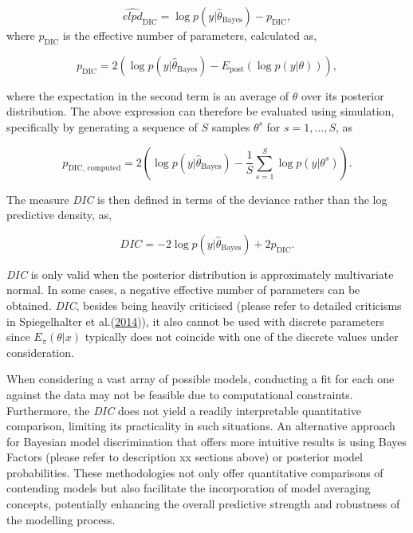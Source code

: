 \documentclass[
  11pt,
]{article}
\begin{document}
\begin{equation}
\widehat{elpd}_{\text{DIC}} = \log p(y|\hat{\theta}_{\text{Bayes}}) - p_{\text{DIC}},
\end{equation} where \(p_{\text{DIC}}\) is the effective number of
parameters, calculated as,

\begin{equation}
p_{\text{DIC}} = 2\left(\log p(y|\hat{\theta}_{\text{Bayes}}) - E_{\text{post}}\left(\log p(y|\theta)\right)\right),
\end{equation}

where the expectation in the second term is an average of \(\theta\)
over its posterior distribution. The above expression can therefore be
evaluated using simulation, specifically by generating a sequence of
\(S\) samples \(\theta^s\) for \(s = 1, . . . , S\), as

\begin{equation}
p_{\text{DIC, computed}} = 2 \left(\log p(y|\hat{\theta}_{\text{Bayes}}) - \frac{1}{S} \sum_{s=1}^{S} \log p(y|{\theta}^s)\right).
\end{equation}

The measure \emph{DIC} is then defined in terms of the deviance rather
than the log predictive density, as,

\begin{equation}
DIC = -2 \log p(y|\hat{\theta}_{\text{Bayes}}) + 2p_{\text{DIC}}.
\end{equation}

\emph{DIC} is only valid when the posterior distribution is
approximately multivariate normal. In some cases, a negative effective
number of parameters can be obtained. \emph{DIC}, besides being heavily
criticised (please refer to detailed criticisms in Spiegelhalter et
al.(\protect\hyperlink{ref-Spiegelhalter2014}{2014})), it also cannot be
used with discrete parameters since \(E_{\pi}(\theta|x)\) typically does
not coincide with one of the discrete values under consideration.

When considering a vast array of possible models, conducting a fit for
each one against the data may not be feasible due to computational
constraints. Furthermore, the \emph{DIC} does not yield a readily
interpretable quantitative comparison, limiting its practicality in such
situations. An alternative approach for Bayesian model discrimination
that offers more intuitive results is using Bayes Factors (please refer
to description xx sections above) or posterior model probabilities.
These methodologies not only offer quantitative comparisons of
contending models but also facilitate the incorporation of model
averaging concepts, potentially enhancing the overall predictive
strength and robustness of the modelling process.
\end{document}
